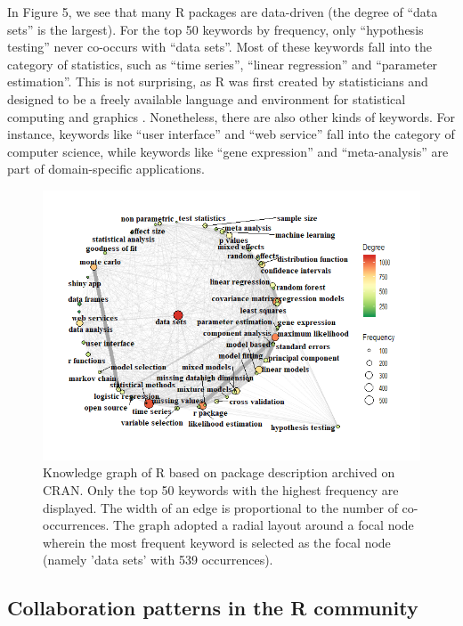 In Figure 5, we see that many R packages are data-driven (the degree of
``data sets'' is the largest). For the top 50 keywords by frequency,
only ``hypothesis testing'' never co-occurs with ``data sets''. Most of
these keywords fall into the category of statistics, such as ``time
series'', ``linear regression'' and ``parameter estimation''. This is
not surprising, as R was first created by statisticians and designed to
be a freely available language and environment for statistical computing
and graphics \citep{IhakaGentleman-501}. Nonetheless, there are also
other kinds of keywords. For instance, keywords like ``user interface''
and ``web service'' fall into the category of computer science, while
keywords like ``gene expression'' and ``meta-analysis'' are part of
domain-specific applications.

\begin{Schunk}
\begin{figure}
\includegraphics[width=1\linewidth,height=0.3\textheight]{fig5} \caption[Knowledge graph of R based on package description archived on CRAN]{Knowledge graph of R based on package description archived on CRAN. Only the top 50 keywords with the highest frequency are displayed. The width of an edge is proportional to the number of co-occurrences. The graph adopted a radial layout around a focal node wherein the most frequent keyword is selected as the focal node (namely 'data sets' with 539 occurrences). }\label{fig:fig5}
\end{figure}
\end{Schunk}

\hypertarget{collaboration-patterns-in-the-r-community}{%
\subsection{Collaboration patterns in the R
community}\label{collaboration-patterns-in-the-r-community}}

